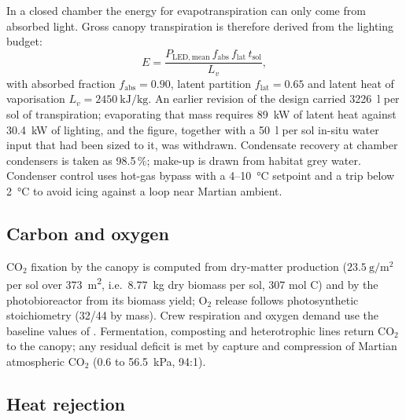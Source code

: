 \documentclass[11pt,a4paper,3p,authoryear]{elsarticle}
\begin{document}
In a closed chamber the energy for evapotranspiration can only come from absorbed light. Gross canopy transpiration is therefore derived from the lighting budget:
\begin{equation}
E = \frac{P_\mathrm{LED,mean}\, f_\mathrm{abs}\, f_\mathrm{lat}\, t_\mathrm{sol}}{L_v},
\label{eq:transp}
\end{equation}
with absorbed fraction $f_\mathrm{abs} = 0.90$, latent partition $f_\mathrm{lat} = 0.65$ and latent heat of vaporisation $L_v = \SI{2450}{\kilo\joule\per\kilo\gram}$. An earlier revision of the design carried \SI{3226}{\litre} per sol of transpiration; evaporating that mass requires \SI{89}{\kilo\watt} of latent heat against \SI{30.4}{\kilo\watt} of lighting, and the figure, together with a \SI{50}{\litre} per sol in-situ water input that had been sized to it, was withdrawn. Condensate recovery at chamber condensers is taken as 98.5\,\%; make-up is drawn from habitat grey water. Condenser control uses hot-gas bypass with a 4--\SI{10}{\celsius} setpoint and a trip below \SI{2}{\celsius} to avoid icing against a loop near Martian ambient.

\subsection{Carbon and oxygen}

CO$_2$ fixation by the canopy is computed from dry-matter production ($\SI{23.5}{\gram\per\metre\squared}$ per sol over \SI{373}{\metre\squared}, i.e.\ \SI{8.77}{\kilo\gram} dry biomass per sol, 307 mol C) and by the photobioreactor from its biomass yield; O$_2$ release follows photosynthetic stoichiometry (32/44 by mass). Crew respiration and oxygen demand use the baseline values of \citet{Anderson2018bvad}. Fermentation, composting and heterotrophic lines return CO$_2$ to the canopy; any residual deficit is met by capture and compression of Martian atmospheric CO$_2$ (0.6 to \SI{56.5}{\kilo\pascal}, 94:1).

\subsection{Heat rejection}
\end{document}
